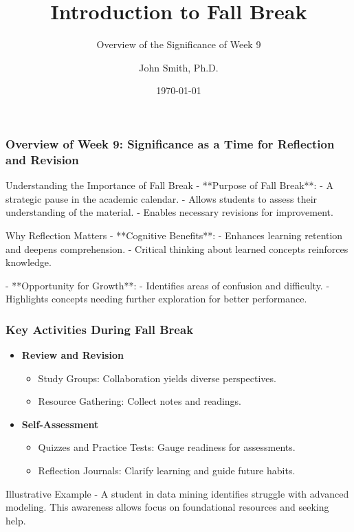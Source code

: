 \documentclass[aspectratio=169]{beamer}
\begin{document}
\frame{\titlepage}

\begin{frame}[fragile]
    \title{Introduction to Fall Break}
    \subtitle{Overview of the Significance of Week 9}
    \author{John Smith, Ph.D.}
    \date{\today}
    \titlepage
\end{frame}

\begin{frame}[fragile]
    \frametitle{Overview of Week 9: Significance as a Time for Reflection and Revision}
    
    \begin{block}{Understanding the Importance of Fall Break}
        - **Purpose of Fall Break**:
            - A strategic pause in the academic calendar.
            - Allows students to assess their understanding of the material.
            - Enables necessary revisions for improvement.
    \end{block}

    \begin{block}{Why Reflection Matters}
        - **Cognitive Benefits**:
            - Enhances learning retention and deepens comprehension.
            - Critical thinking about learned concepts reinforces knowledge.
        
        - **Opportunity for Growth**:
            - Identifies areas of confusion and difficulty.
            - Highlights concepts needing further exploration for better performance.
    \end{block}
\end{frame}

\begin{frame}[fragile]
    \frametitle{Key Activities During Fall Break}
    
    \begin{itemize}
        \item \textbf{Review and Revision}
            \begin{itemize}
                \item Study Groups: Collaboration yields diverse perspectives.
                \item Resource Gathering: Collect notes and readings.
            \end{itemize}
        
        \item \textbf{Self-Assessment}
            \begin{itemize}
                \item Quizzes and Practice Tests: Gauge readiness for assessments.
                \item Reflection Journals: Clarify learning and guide future habits.
            \end{itemize}
    \end{itemize}
    
    \begin{block}{Illustrative Example}
        - A student in data mining identifies struggle with advanced modeling. This awareness allows focus on foundational resources and seeking help.
    \end{block}
\end{frame}
\end{document}
